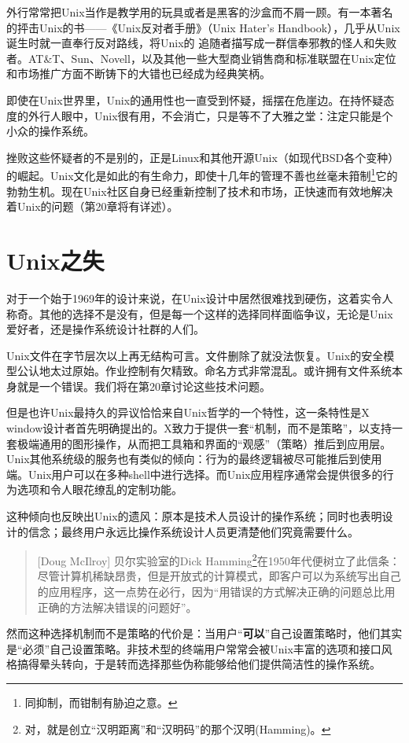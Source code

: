 \documentclass[12pt,oneside]{book}
\begin{document}
\begin{common-format}
外行常常把Unix当作是教学用的玩具或者是黑客的沙盒而不屑一顾。有一本著名的抨击Unix的书——《Unix反对者手册》（Unix Hater's Handbook）\cite{Garfinkel}，几乎从Unix诞生时就一直奉行反对路线，将Unix的 追随者描写成一群信奉邪教的怪人和失败者。AT\&{}T、Sun、Novell，以及其他一些大型商业销售商和标准联盟在Unix定位和市场推广方面不断铸下的大错也已经成为经典笑柄。

即使在Unix世界里，Unix的通用性也一直受到怀疑，摇摆在危崖边。在持怀疑态度的外行人眼中，Unix很有用，不会消亡，只是等不了大雅之堂：注定只能是个小众的操作系统。

挫败这些怀疑者的不是别的，正是Linux和其他开源Unix（如现代BSD各个变种）的崛起。Unix文化是如此的有生命力，即使十几年的管理不善也丝毫未箝制\footnote{同抑制，而钳制有胁迫之意。}它的勃勃生机。现在Unix社区自身已经重新控制了技术和市场，正快速而有效地解决着Unix的问题（第20章将有详述）。


\section{Unix之失}
对于一个始于1969年的设计来说，在Unix设计中居然很难找到硬伤，这着实令人称奇。其他的选择不是没有，但是每一个这样的选择同样面临争议，无论是Unix爱好者，还是操作系统设计社群的人们。

Unix文件在字节层次以上再无结构可言。文件删除了就没法恢复。Unix的安全模型公认地太过原始。作业控制有欠精致。命名方式非常混乱。或许拥有文件系统本身就是一个错误。我们将在第20章讨论这些技术问题。

但是也许Unix最持久的异议恰恰来自Unix哲学的一个特性，这一条特性是X window设计者首先明确提出的。X致力于提供一套“机制，而不是策略”，以支持一套极端通用的图形操作，从而把工具箱和界面的“观感”（策略）推后到应用层。Unix其他系统级的服务也有类似的倾向：行为的最终逻辑被尽可能推后到使用端。Unix用户可以在多种shell中进行选择。而Unix应用程序通常会提供很多的行为选项和令人眼花缭乱的定制功能。

这种倾向也反映出Unix的遗风：原本是技术人员设计的操作系统；同时也表明设计的信念；最终用户永远比操作系统设计人员更清楚他们究竟需要什么。

\begin{quote}[Doug McIlroy]
贝尔实验室的Dick Hamming\footnote{对，就是创立“汉明距离”和“汉明码”的那个汉明(Hamming)。}在1950年代便树立了此信条：尽管计算机稀缺昂贵，但是开放式的计算模式，即客户可以为系统写出自己的应用程序，这一点势在必行，因为“用错误的方式解决正确的问题总比用正确的方法解决错误的问题好”。
\end{quote}

然而这种选择机制而不是策略的代价是：当用户“\textbf{可以}”自己设置策略时，他们其实是“必须”自己设置策略。非技术型的终端用户常常会被Unix丰富的选项和接口风格搞得晕头转向，于是转而选择那些伪称能够给他们提供简洁性的操作系统。


\end{common-format}
\end{document}
